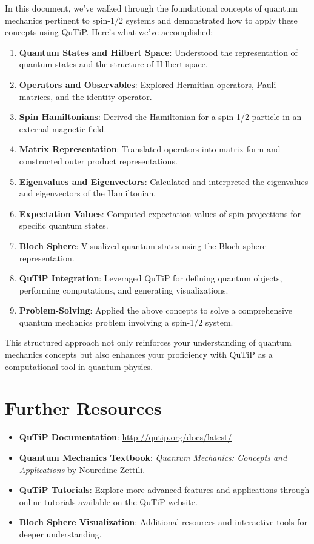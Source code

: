 \documentclass[12pt]{article}
\begin{document}
In this document, we've walked through the foundational concepts of quantum mechanics pertinent to spin-1/2 systems and demonstrated how to apply these concepts using QuTiP. Here's what we've accomplished:

\begin{enumerate}
    \item \textbf{Quantum States and Hilbert Space}: Understood the representation of quantum states and the structure of Hilbert space.
    \item \textbf{Operators and Observables}: Explored Hermitian operators, Pauli matrices, and the identity operator.
    \item \textbf{Spin Hamiltonians}: Derived the Hamiltonian for a spin-1/2 particle in an external magnetic field.
    \item \textbf{Matrix Representation}: Translated operators into matrix form and constructed outer product representations.
    \item \textbf{Eigenvalues and Eigenvectors}: Calculated and interpreted the eigenvalues and eigenvectors of the Hamiltonian.
    \item \textbf{Expectation Values}: Computed expectation values of spin projections for specific quantum states.
    \item \textbf{Bloch Sphere}: Visualized quantum states using the Bloch sphere representation.
    \item \textbf{QuTiP Integration}: Leveraged QuTiP for defining quantum objects, performing computations, and generating visualizations.
    \item \textbf{Problem-Solving}: Applied the above concepts to solve a comprehensive quantum mechanics problem involving a spin-1/2 system.
\end{enumerate}

This structured approach not only reinforces your understanding of quantum mechanics concepts but also enhances your proficiency with QuTiP as a computational tool in quantum physics.

\section{Further Resources}

\begin{itemize}
    \item \textbf{QuTiP Documentation}: \url{http://qutip.org/docs/latest/}
    \item \textbf{Quantum Mechanics Textbook}: \textit{Quantum Mechanics: Concepts and Applications} by Nouredine Zettili.
    \item \textbf{QuTiP Tutorials}: Explore more advanced features and applications through online tutorials available on the QuTiP website.
    \item \textbf{Bloch Sphere Visualization}: Additional resources and interactive tools for deeper understanding.
\end{itemize}
\end{document}
